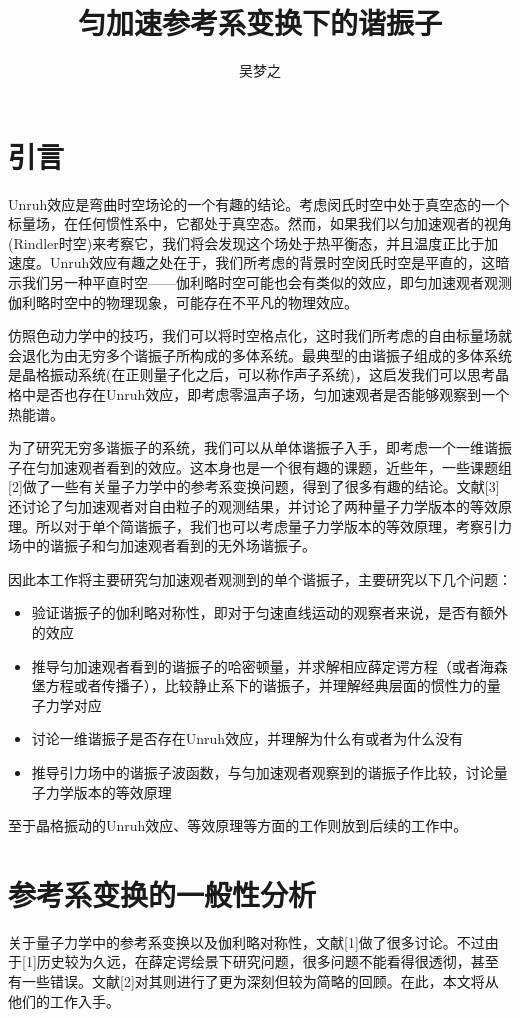 \documentclass[a4paper]{article}
\title{匀加速参考系变换下的谐振子}
\author{吴梦之}
\begin{document}
    \maketitle
    \section{引言}
        Unruh效应是弯曲时空场论的一个有趣的结论。考虑闵氏时空中处于真空态的一个标量场，在任何惯性系中，它都处于真空态。然而，如果我们以匀加速观者的视角(Rindler时空)来考察它，我们将会发现这个场处于热平衡态，并且温度正比于加速度。Unruh效应有趣之处在于，我们所考虑的背景时空闵氏时空是平直的，这暗示我们另一种平直时空——伽利略时空可能也会有类似的效应，即匀加速观者观测伽利略时空中的物理现象，可能存在不平凡的物理效应。

        仿照色动力学中的技巧，我们可以将时空格点化，这时我们所考虑的自由标量场就会退化为由无穷多个谐振子所构成的多体系统。最典型的由谐振子组成的多体系统是晶格振动系统(在正则量子化之后，可以称作声子系统)，这启发我们可以思考晶格中是否也存在Unruh效应，即考虑零温声子场，匀加速观者是否能够观察到一个热能谱。

        为了研究无穷多谐振子的系统，我们可以从单体谐振子入手，即考虑一个一维谐振子在匀加速观者看到的效应。这本身也是一个很有趣的课题，近些年，一些课题组[2]做了一些有关量子力学中的参考系变换问题，得到了很多有趣的结论。文献[3]还讨论了匀加速观者对自由粒子的观测结果，并讨论了两种量子力学版本的等效原理。所以对于单个简谐振子，我们也可以考虑量子力学版本的等效原理，考察引力场中的谐振子和匀加速观者看到的无外场谐振子。

        因此本工作将主要研究匀加速观者观测到的单个谐振子，主要研究以下几个问题：
        \begin{itemize}
            \item 验证谐振子的伽利略对称性，即对于匀速直线运动的观察者来说，是否有额外的效应
            \item 推导匀加速观者看到的谐振子的哈密顿量，并求解相应薛定谔方程（或者海森堡方程或者传播子），比较静止系下的谐振子，并理解经典层面的惯性力的量子力学对应
            \item 讨论一维谐振子是否存在Unruh效应，并理解为什么有或者为什么没有
            \item 推导引力场中的谐振子波函数，与匀加速观者观察到的谐振子作比较，讨论量子力学版本的等效原理
        \end{itemize}

        至于晶格振动的Unruh效应、等效原理等方面的工作则放到后续的工作中。


    \section{参考系变换的一般性分析}
        关于量子力学中的参考系变换以及伽利略对称性，文献[1]做了很多讨论。不过由于[1]历史较为久远，在薛定谔绘景下研究问题，很多问题不能看得很透彻，甚至有一些错误。文献[2]对其则进行了更为深刻但较为简略的回顾。在此，本文将从他们的工作入手。
\end{document}
